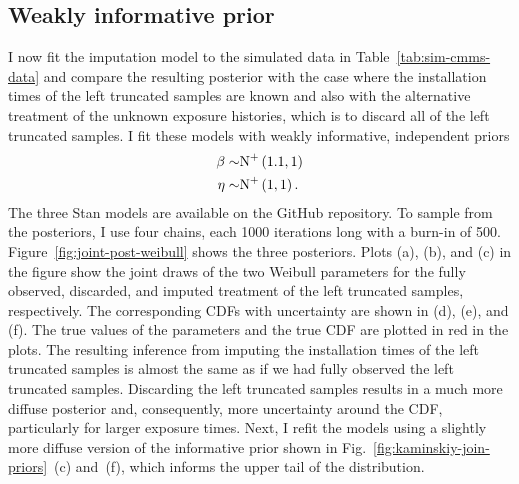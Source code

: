 

\subsection{Weakly informative prior} \label{subsec:weibull-model-fits}

I now fit the imputation model to the simulated data in Table~\ref{tab:sim-cmms-data} and compare the resulting posterior with the case where the installation times of the left truncated samples are known and also with the alternative treatment of the unknown exposure histories, which is to discard all of the left truncated samples. I fit these models with weakly informative, independent priors
\begin{align*}
    \beta \sim & \hbox{N}^{+}\left(1.1, 1\right)  \\
    \eta \sim & \hbox{N}^{+}\left(1, 1\right).
\end{align*}
The three Stan models are available on the GitHub repository. To sample from the posteriors, I use four chains, each 1000 iterations long with a burn-in of 500. Figure~\ref{fig:joint-post-weibull} shows the three posteriors. Plots (a), (b), and (c) in the figure show the joint draws of the two Weibull parameters for the fully observed, discarded, and imputed treatment of the left truncated samples, respectively. The corresponding CDFs with uncertainty are shown in (d), (e), and (f). The true values of the parameters and the true CDF are plotted in red in the plots. The resulting inference from imputing the installation times of the left truncated samples is almost the same as if we had fully observed the left truncated samples. Discarding the left truncated samples results in a much more diffuse posterior and, consequently, more uncertainty around the CDF, particularly for larger exposure times. Next, I refit the models using a slightly more diffuse version of the informative prior shown in Fig.~\ref{fig:kaminskiy-join-priors}~(c) and~(f), which informs the upper tail of the distribution.

